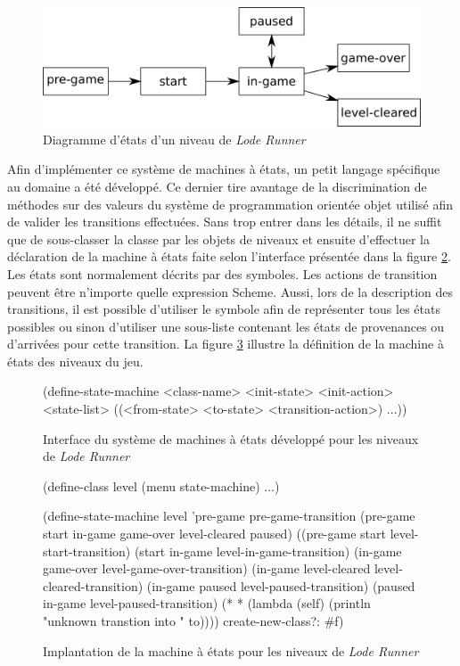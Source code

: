 \documentclass[12pt,twoside,letterpaper,francais]{book}
\newcommand{\scheme}[1]{\selectlanguage{english}{\tt #1}\selectlanguage{french}}
\begin{document}
\begin{figure}[htb!]
  \center
  \includegraphics[scale=0.7]{lr-state-diag}
  \caption{Diagramme d'états d'un niveau de \textit{Lode Runner}}
  \label{Exp:lr-state-diag}
\end{figure}

Afin d'implémenter ce système de machines à états, un petit langage
spécifique au domaine a été développé. Ce dernier tire avantage de la
discrimination de méthodes sur des valeurs du système de programmation
orientée objet utilisé afin de valider les transitions
effectuées. Sans trop entrer dans les détails, il ne suffit que de
sous-classer la classe \scheme{state-machine} par les objets de
niveaux et ensuite d'effectuer la déclaration de la machine à états
faite selon l'interface présentée dans la figure
\ref{Exp:def-state}. Les états sont normalement décrits par des
symboles. Les actions de transition peuvent être n'importe quelle
expression Scheme. Aussi, lors de la description des transitions, il
est possible d'utiliser le symbole \scheme{*} afin de représenter tous
les états possibles ou sinon d'utiliser une sous-liste contenant les
états de provenances ou d'arrivées pour cette transition. La figure
\ref{Exp:lr-lvl-state-machine} illustre la définition de la machine à
états des niveaux du jeu.\\

\begin{figure}[htb1]
  \begin{schemecode}
(define-state-machine 
  <class-name> <init-state> <init-action> <state-list>
  ((<from-state> <to-state> <transition-action>) ...))
  \end{schemecode}
  \caption{Interface du système de machines à états développé pour les
    niveaux de \textit{Lode Runner}}
  \label{Exp:def-state}
\end{figure}

\begin{figure}[htb!]
  \begin{schemecode}
(define-class level (menu state-machine) ...)

(define-state-machine level
  'pre-game pre-game-transition
  (pre-game start in-game game-over level-cleared paused)
  ((pre-game start         level-start-transition)
   (start    in-game       level-in-game-transition)
   (in-game  game-over     level-game-over-transition)
   (in-game  level-cleared level-cleared-transition)
   (in-game  paused        level-paused-transition)
   (paused   in-game       level-paused-transition)
   (* * (lambda (self) (println "unknown transtion into " to))))
  create-new-class?: \#f)
  \end{schemecode}
  \caption{Implantation de la machine à états pour les niveaux de \textit{Lode Runner}}
  \label{Exp:lr-lvl-state-machine}
\end{figure}
\end{document}
